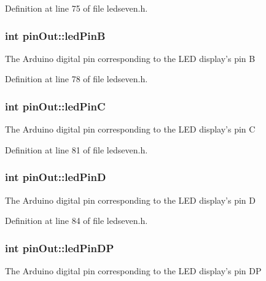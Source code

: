 Definition at line 75 of file ledseven.\+h.

\hypertarget{structpin_out_af3461f90e21457cdb1f46a3d8085ac06}{
\subsubsection[{led\+Pin\+B}]{\setlength{\rightskip}{0pt plus 5cm}int pin\+Out\+::led\+Pin\+B}}\label{structpin_out_af3461f90e21457cdb1f46a3d8085ac06}
The Arduino digital pin corresponding to the L\+E\+D display's pin B 

Definition at line 78 of file ledseven.\+h.

\hypertarget{structpin_out_afb9d6f76a96cc304defd23f3be3a0c9d}{
\subsubsection[{led\+Pin\+C}]{\setlength{\rightskip}{0pt plus 5cm}int pin\+Out\+::led\+Pin\+C}}\label{structpin_out_afb9d6f76a96cc304defd23f3be3a0c9d}
The Arduino digital pin corresponding to the L\+E\+D display's pin C 

Definition at line 81 of file ledseven.\+h.

\hypertarget{structpin_out_a7cf8e2fe62554d6edd30f6452a8c9a62}{
\subsubsection[{led\+Pin\+D}]{\setlength{\rightskip}{0pt plus 5cm}int pin\+Out\+::led\+Pin\+D}}\label{structpin_out_a7cf8e2fe62554d6edd30f6452a8c9a62}
The Arduino digital pin corresponding to the L\+E\+D display's pin D 

Definition at line 84 of file ledseven.\+h.

\hypertarget{structpin_out_a792d269e540bea0a98e97049975fc110}{
\subsubsection[{led\+Pin\+D\+P}]{\setlength{\rightskip}{0pt plus 5cm}int pin\+Out\+::led\+Pin\+D\+P}}\label{structpin_out_a792d269e540bea0a98e97049975fc110}
The Arduino digital pin corresponding to the L\+E\+D display's pin D\+P 

